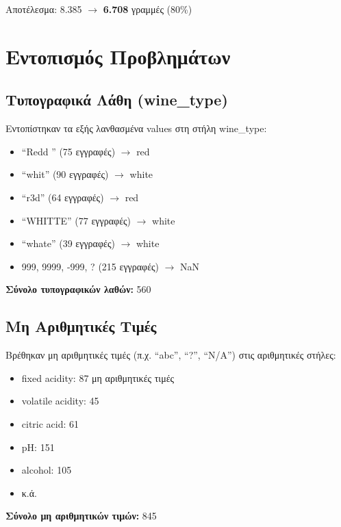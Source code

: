 \documentclass[12pt,a4paper]{article}
\begin{document}
\textgreek{Αποτέλεσμα:} 8.385 $\rightarrow$ \textbf{6.708} \textgreek{γραμμές (80\%)}

\section{\textgreek{Εντοπισμός Προβλημάτων}}

\subsection{\textgreek{Τυπογραφικά Λάθη (wine\_type)}}

\textgreek{Εντοπίστηκαν τα εξής λανθασμένα values στη στήλη wine\_type:}

\begin{itemize}
    \item ``Redd '' (75 \textgreek{εγγραφές}) $\rightarrow$ red
    \item ``whit'' (90 \textgreek{εγγραφές}) $\rightarrow$ white
    \item ``r3d'' (64 \textgreek{εγγραφές}) $\rightarrow$ red
    \item ``WHITTE'' (77 \textgreek{εγγραφές}) $\rightarrow$ white
    \item ``whate'' (39 \textgreek{εγγραφές}) $\rightarrow$ white
    \item 999, 9999, -999, ? (215 \textgreek{εγγραφές}) $\rightarrow$ NaN
\end{itemize}

\textbf{\textgreek{Σύνολο τυπογραφικών λαθών:}} 560

\subsection{\textgreek{Μη Αριθμητικές Τιμές}}

\textgreek{Βρέθηκαν μη αριθμητικές τιμές (π.χ. ``abc'', ``?'', ``N/A'') στις αριθμητικές στήλες:}

\begin{itemize}
    \item fixed acidity: 87 \textgreek{μη αριθμητικές τιμές}
    \item volatile acidity: 45
    \item citric acid: 61
    \item pH: 151
    \item alcohol: 105
    \item \textgreek{κ.ά.}
\end{itemize}

\textbf{\textgreek{Σύνολο μη αριθμητικών τιμών:}} 845
\end{document}
